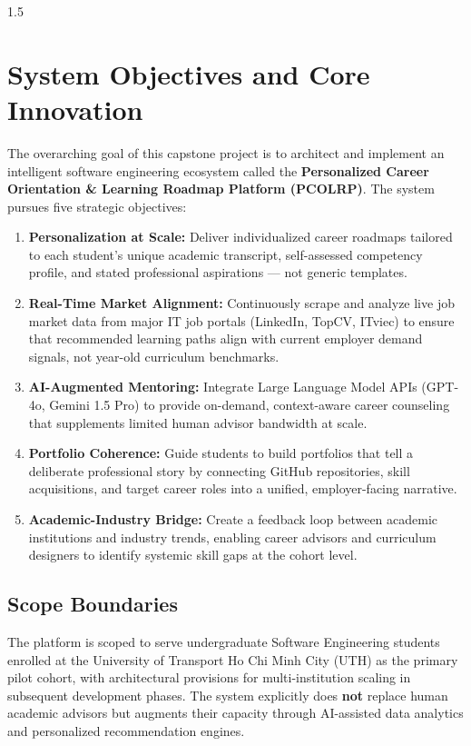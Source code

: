 \documentclass[12pt,a4paper]{report}
\begin{document}
\begin{spacing}{1.5}
		\section{System Objectives and Core Innovation}
		
		The overarching goal of this capstone project is to architect and implement an intelligent software engineering ecosystem called the \textbf{Personalized Career Orientation \& Learning Roadmap Platform (PCOLRP)}. The system pursues five strategic objectives:
		
		\begin{enumerate}
			\item \textbf{Personalization at Scale:} Deliver individualized career roadmaps tailored to each student's unique academic transcript, self-assessed competency profile, and stated professional aspirations --- not generic templates.
			
			\item \textbf{Real-Time Market Alignment:} Continuously scrape and analyze live job market data from major IT job portals (LinkedIn, TopCV, ITviec) to ensure that recommended learning paths align with current employer demand signals, not year-old curriculum benchmarks.
			
			\item \textbf{AI-Augmented Mentoring:} Integrate Large Language Model APIs (GPT-4o, Gemini 1.5 Pro) to provide on-demand, context-aware career counseling that supplements limited human advisor bandwidth at scale.
			
			\item \textbf{Portfolio Coherence:} Guide students to build portfolios that tell a deliberate professional story by connecting GitHub repositories, skill acquisitions, and target career roles into a unified, employer-facing narrative.
			
			\item \textbf{Academic-Industry Bridge:} Create a feedback loop between academic institutions and industry trends, enabling career advisors and curriculum designers to identify systemic skill gaps at the cohort level.
		\end{enumerate}
		
		\subsection{Scope Boundaries}
		
		The platform is scoped to serve undergraduate Software Engineering students enrolled at the University of Transport Ho Chi Minh City (UTH) as the primary pilot cohort, with architectural provisions for multi-institution scaling in subsequent development phases. The system explicitly does \textbf{not} replace human academic advisors but augments their capacity through AI-assisted data analytics and personalized recommendation engines.
		

\end{spacing}
\end{document}
